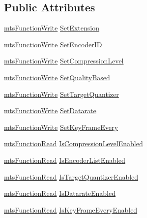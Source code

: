 \subsection*{Public Attributes}
\begin{DoxyCompactItemize}
\item 
\hyperlink{classmts_function_write}{mts\-Function\-Write} \hyperlink{class_i_req_video_encoder_aa86ec80db25cb67ffcfa26f7854f1558}{Set\-Extension}
\item 
\hyperlink{classmts_function_write}{mts\-Function\-Write} \hyperlink{class_i_req_video_encoder_a2fb9540255360b9db74be79f56ae6808}{Set\-Encoder\-I\-D}
\item 
\hyperlink{classmts_function_write}{mts\-Function\-Write} \hyperlink{class_i_req_video_encoder_a405f5708c6730da10eaa27c39cb6a988}{Set\-Compression\-Level}
\item 
\hyperlink{classmts_function_write}{mts\-Function\-Write} \hyperlink{class_i_req_video_encoder_a1504d33fbcfbea1d10f206106da74868}{Set\-Quality\-Based}
\item 
\hyperlink{classmts_function_write}{mts\-Function\-Write} \hyperlink{class_i_req_video_encoder_a5178233369b251350c538a239477f859}{Set\-Target\-Quantizer}
\item 
\hyperlink{classmts_function_write}{mts\-Function\-Write} \hyperlink{class_i_req_video_encoder_a76ea2366cc302bfb4b80037e8bb76a97}{Set\-Datarate}
\item 
\hyperlink{classmts_function_write}{mts\-Function\-Write} \hyperlink{class_i_req_video_encoder_a1e9188a979450ad1c3d71be5ad90dd2f}{Set\-Key\-Frame\-Every}
\item 
\hyperlink{classmts_function_read}{mts\-Function\-Read} \hyperlink{class_i_req_video_encoder_a347cb959317c01f134b806786da73fd9}{Is\-Compression\-Level\-Enabled}
\item 
\hyperlink{classmts_function_read}{mts\-Function\-Read} \hyperlink{class_i_req_video_encoder_aea51b8231253b9d5858db8ee46347356}{Is\-Encoder\-List\-Enabled}
\item 
\hyperlink{classmts_function_read}{mts\-Function\-Read} \hyperlink{class_i_req_video_encoder_a2b8cdbb2dd719ed1e38b8b3ea6821a7c}{Is\-Target\-Quantizer\-Enabled}
\item 
\hyperlink{classmts_function_read}{mts\-Function\-Read} \hyperlink{class_i_req_video_encoder_a1de1f00a33225eb14bd5582401e30117}{Is\-Datarate\-Enabled}
\item 
\hyperlink{classmts_function_read}{mts\-Function\-Read} \hyperlink{class_i_req_video_encoder_a492b0452c80889adfb90f1971c3e4eab}{Is\-Key\-Frame\-Every\-Enabled}

\end{DoxyCompactItemize}
